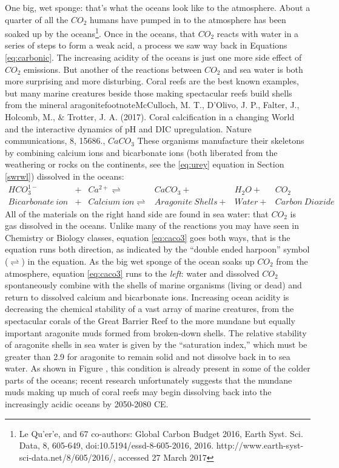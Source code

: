 One big, wet sponge: that's what the oceans look like to the atmosphere. About a quarter of all the $CO_2$ humans have pumped in to the atmosphere has been soaked up by the oceans\footnote{ Le Qu'er'e, and 67 co-authors: Global Carbon Budget 2016, Earth Syst. Sci. Data, 8, 605-649, doi:10.5194/essd-8-605-2016, 2016. http://www.earth-syst-sci-data.net/8/605/2016/, accessed 27 March 2017}. Once in the oceans, that $CO_2$ reacts with water in a series of steps to form a weak acid, a process we saw way back in Equations \ref{eq:carbonic}. The increasing acidity of the oceans is just one more side effect of $CO_2$ emissions. But another of the reactions between $CO_2$ and sea water is both more surprising and more disturbing. Coral reefs are the best known examples, but many marine creatures beside those making spectacular reefs build shells from the mineral aragonite{footnote{McCulloch, M. T., D'Olivo, J. P., Falter, J., Holcomb, M., \& Trotter, J. A. (2017). Coral calcification in a changing World and the interactive dynamics of pH and DIC upregulation. Nature communications, 8, 15686.}, $CaCO_3$ These organisms manufacture their skeletons by combining calcium ions and bicarbonate ions (both liberated from the weathering or rocks on the continents, see the \ref{eq:urey} equation in Section \ref{swrwl}) dissolved in the oceans: 
\begin{align} \label{eq:caco3}
	HCO_3^{1-} & + & Ca^{2+} \rightleftharpoons & CaCO_3 + & H_2O + & CO_2\\
	Bicarbonate \ ion & + & Calcium \ ion \rightleftharpoons & Aragonite \ Shells + & Water+ & Carbon \ Dioxide 
\end{align}
All of the materials on the right hand side are found in sea water: that $CO_2$ is gas dissolved in the oceans. Unlike many of the reactions you may have seen in Chemistry or Biology classes, equation \ref{eq:caco3} goes both ways, that is the equation runs both direction, as indicated by the ``double ended harpoon'' symbol ($\rightleftharpoons$) in the equation. As the big wet sponge of the ocean soaks up $CO_2$ from the atmosphere, equation \ref{eq:caco3} runs to the \emph{left}: water and dissolved $CO_2$ spontaneously combine with the shells of marine organisms (living or dead) and return to dissolved calcium and bicarbonate ions. Increasing ocean acidity is decreasing the chemical stability of a vast array of marine creatures, from the spectacular corals of the Great Barrier Reef to the more mundane but equally important aragonite muds formed from broken-down shells. The relative stability of aragonite shells in sea water is given by the ``saturation index,'' which must be greater than 2.9 for aragonite to remain solid and not dissolve back in to sea water. As shown in Figure \label{fig:arag_map}, this condition is already present in some of the colder parts of the oceans; recent research unfortunately suggests that the mundane muds making up much of coral reefs may begin dissolving back into the increasingly acidic oceans by 2050-2080 CE. \\
}

